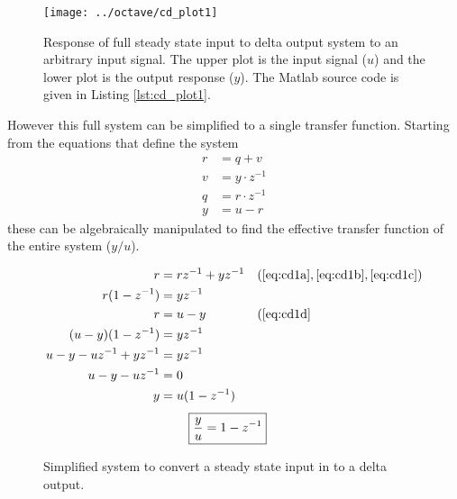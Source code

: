\documentclass{article}
\begin{document}
\begin{figure}[htbp!]
\texttt{[image: ../octave/cd\_plot1]}
\caption{Response of full steady state input to delta output system
to an arbitrary input signal.
The upper plot is the input signal ($u$) and the lower plot is
the output response ($y$).
The Matlab source code is given in Listing \ref{lst:cd_plot1}.
}
\label{fig:cd_plot1}
\end{figure}

\begin{samepage}
However this full system can be simplified to a single transfer function.
Starting from the equations that define the system
\begin{align}
	r &= q + v \label{eq:cd1a} \\
	v &= y \cdot z^{-1} \label{eq:cd1b} \\
	q &= r \cdot z^{-1} \label{eq:cd1c} \\
	y &= u - r \label{eq:cd1d}
\end{align}
these can be algebraically manipulated to find the effective transfer
function of the entire system ($y/u$).
\end{samepage}

\begin{align*}
	r &= r z^{-1} + y z^{-1} && (\ref{eq:cd1a}, \ref{eq:cd1b}, \ref{eq:cd1c})\\
	r(1 - z^{-1}) &= y z^{-1} \\
	r &= u - y && (\ref{eq:cd1d} \\
	(u - y)(1 - z^{-1}) &= y z^{-1} \\
	u - y - u z^{-1} + y z^{-1} &= y z^{-1} \\
	u - y - u z^{-1} &= 0 \\
	y &= u (1 - z^{-1})
\end{align*}
\begin{align}
	\Aboxed{ \frac{y}{u} &= 1 - z^{-1} }
\end{align}

\begin{figure}[!htbp]
\begin{center}


\end{center}
\caption{Simplified system to convert a steady state input in to
a delta output.}
\label{fig:cd1s}
\end{figure}
\end{document}
